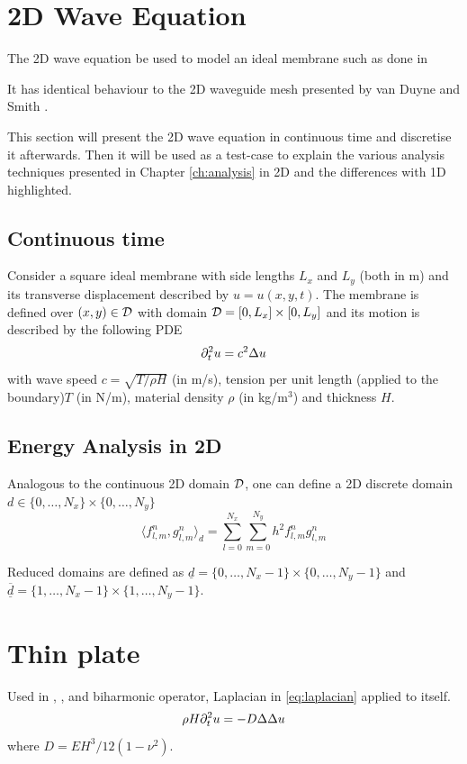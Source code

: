 \section{2D Wave Equation}
The 2D wave equation be used to model an ideal membrane such as done in 

It has identical behaviour to the 2D waveguide mesh presented by van Duyne and Smith \cite{Duyne1993}.

This section will present the 2D wave equation in continuous time and discretise it afterwards. Then it will be used as a test-case to explain the various analysis techniques presented in Chapter \ref{ch:analysis} in 2D and the differences with 1D highlighted.

\subsection{Continuous time}
Consider a square ideal membrane with side lengths $L_x$ and $L_y$ (both in m) and its transverse displacement described by $u = u(x,y,t)$. The membrane is defined over $(x,y) \in \mathcal{D}$ with domain $\mathcal{D} = [0, L_x] \times[0, L_y]$ and its motion is described by the following PDE
\begin{equation}\label{eq:2DwavePDE}
    \partial_t^2 u = c^2\Delta u
\end{equation}
with wave speed $c = \sqrt{T/\rho H}$ (in m/s), tension per unit length (applied to the boundary)$T$ (in N/m), material density $\rho$ (in kg/m$^3$) and thickness $H$.



\subsection{Energy Analysis in 2D}
Analogous to the continuous 2D domain $\mathcal{D}$, one can define a 2D discrete domain $d\in \{0, \hdots, N_x\} \times \{0, \hdots, N_y\}$
\begin{equation}\label{eq:2DInnerProd}
    \langle f^n_{l, m}, g^n_{l, m} \rangle_d = \sum_{l = 0}^{N_x}\sum_{m = 0}^{N_y} h^2 f_{l,m}^n g_{l,m}^n
\end{equation}

Reduced domains are defined as $\underline{d} = \{0, \hdots, N_x-1\} \times \{0, \hdots, N_y-1\}$ and $\underline{\overline{d}} = \{1, \hdots, N_x-1\}\times\{1, \hdots, N_y-1\}$.

\section{Thin plate}\label{sec:thinPlate}
Used in \citeP[A], \citeP[B], \citeP[D] and \citeP[E]
biharmonic operator, Laplacian in \eqref{eq:laplacian} applied to itself.
\begin{equation}\label{eq:platePDENoLosses}
    \rho H \partial_t^2 u = -D\Delta\Delta u
\end{equation}
where $D = EH^3/12(1-\nu^2)$.

